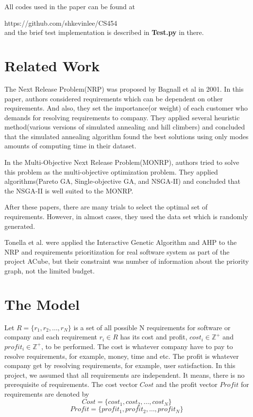 All codes used in the paper can be found at 

https://github.com/shkevinlee/CS454 \\ and the brief test implementation is described in \textbf{Test.py} in there.

\section{Related Work}
The Next Release Problem(NRP)\cite{NRP} was proposed by Bagnall et al in 2001. In this paper, authors considered requirements which can be dependent on other requirements. And also, they set the importance(or weight) of each customer who demands for resolving requirements to company. They applied several heuristic method(various versions of simulated annealing and hill climbers) and concluded that the simulated annealing algorithm found the best solutions using only modes amounts of computing time in their dataset.

In the Multi-Objective Next Release Problem(MONRP)\cite{MONRP}, authors tried to solve this problem as the multi-objective optimization problem. They applied algorithms(Pareto GA, Single-objective GA, and NSGA-II) and concluded that the NSGA-II is well suited to the MONRP.

After these papers, there are many trials to select the optimal set of requirements.\cite{ILP} \cite{DE} \cite{ACO} However, in almost cases, they used the data set which is randomly generated.

Tonella et al. were applied the Interactive Genetic Algorithm and AHP to the NRP and requirements prioritization for real software system as part of the project ACube, but their constraint was number of information about the priority graph, not the limited budget.\cite{IGA} 



\section{The Model}

Let $R = \{r_1, r_2, \ldots, r_N\}$ is a set of all possible N requirements for software or company and each requirement $r_i \in R$ has its cost and profit, $cost_i \in \mathbb{Z}^+$ and $profit_i \in \mathbb{Z}^+$, to be performed. The cost is whatever company have to pay to resolve requirements, for example, money, time and etc. The profit is whatever company get by resolving requirements, for example, user satisfaction. In this project, we assumed that all requirements are independent. It means, there is no prerequisite of requirements. The cost vector $Cost$ and the profit vector $Profit$ for requirements are denoted by 
\[
Cost = \{cost_1, cost_2, \ldots, cost_N\}
\]
\[
Profit = \{profit_1, profit_2, \ldots, profit_N\}
\]

